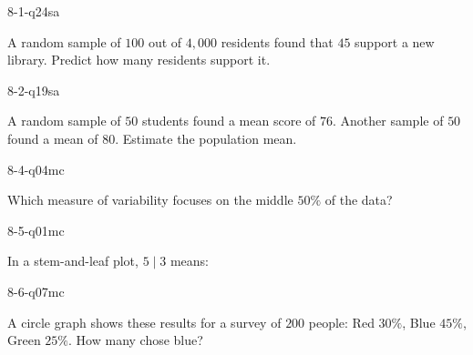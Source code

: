 \begin{practiceQuestion}{8-1-q24}{sa}
\begin{questionText}
A random sample of $100$ out of $4{,}000$ residents found that $45$ support a new library. Predict how many residents support it.
\end{questionText}
\end{practiceQuestion}

\begin{practiceQuestion}{8-2-q19}{sa}
\begin{questionText}
A random sample of $50$ students found a mean score of $76$. Another sample of $50$ found a mean of $80$. Estimate the population mean.
\end{questionText}
\end{practiceQuestion}

\begin{practiceQuestion}{8-4-q04}{mc}
\begin{questionText}
Which measure of variability focuses on the middle $50\%$ of the data?
\end{questionText}
\end{practiceQuestion}

\begin{practiceQuestion}{8-5-q01}{mc}
\begin{questionText}
In a stem-and-leaf plot, $5 \mid 3$ means:
\end{questionText}
\end{practiceQuestion}

\begin{practiceQuestion}{8-6-q07}{mc}
\begin{questionText}
A circle graph shows these results for a survey of $200$ people: Red $30\%$, Blue $45\%$, Green $25\%$. How many chose blue?
\end{questionText}
\end{practiceQuestion}


